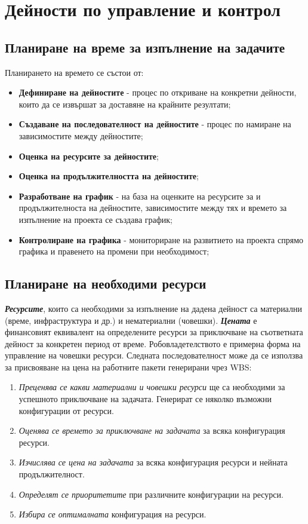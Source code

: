 \documentclass[fleqn,12pt]{article}
\begin{document}
\section{Дейности по управление и контрол}

\subsection{Планиране на време за изпълнение на задачите}

Планирането на времето се състои от:
\begin{itemize}
    \item \textbf{Дефиниране на дейностите} - процес по откриване на конкретни дейности, които да се извършат за доставяне на крайните резултати;
    \item \textbf{Създаване на последователност на дейностите} - процес по намиране на зависимостите между дейностите;
    \item \textbf{Оценка на ресурсите за дейностите};
    \item \textbf{Оценка на продължителността на дейностите};
    \item \textbf{Разработване на график} - на база на оценките на ресурсите за и продължителноста на дейностите, зависимостите между тях и времето за изпълнение на проекта се създава график;
    \item \textbf{Контролиране на графика} - мониториране на развитието на проекта спрямо графика и правенето на промени при необходимост;
\end{itemize}

\subsection{Планиране на необходими ресурси}

\textit{\textbf{Ресурсите}}, които са необходими за изпълнение на дадена дейност са материални (време, инфраструктура и др.) и нематериални (човешки).
\textit{\textbf{Цената}} е финансовият еквивалент на определените ресурси за приключване на съответната дейност за конкретен период от време.
Робовладетелството е примерна форма на управление на човешки ресурси.
\bigbreak
Следната последователност може да се използва за присвояване на цена на работните пакети генерирани чрез WBS:
\begin{enumerate}
    \item \textit{Преценява се какви материални и човешки ресурси} ще са необходими за успешното приключване на задачата.
    Генерират се няколко възможни конфигурации от ресурси.
    \item \textit{Оценява се времето за приключване на задачата} за всяка конфигурация ресурси.
    \item \textit{Изчислява се цена на задачата} за всяка конфигурация ресурси и нейната продължителност.
    \item \textit{Определят се приоритетите} при различните конфигурации на ресурси.
    \item \textit{Избира се оптималната} конфигурация на ресурси.
\end{enumerate}
\end{document}
